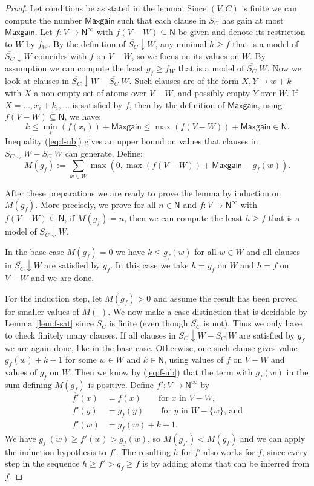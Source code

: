 \documentclass[11pt,a4paper]{article}
\newcommand{\N}{\mathsf{N}}
\newcommand\set[1]{\{#1\}}
\newcommand\Ninf{\N^\infty}
\newcommand\M{\mathsf{Maxgain}}
\newcommand\upS[1]{\overline{S_{#1}}}
\newcommand{\FYI}[1]{{\color{red}#1}}
\begin{document}
\begin{proof}
Let conditions be as stated in the lemma.
\FYI{Since $(V,C)$ is finite we can compute the number
$\M$ such that each clause in $S_C$ has gain at most $\M$.}
Let $f: V\to\Ninf$ with $f(V-W)\subseteq \N$ be given
and denote its restriction to $W$ by $f_W$.
By the definition of $\upS{C}{\downarrow}W$, any minimal $h\geqslant f$
that is a model of $\upS{C}{\downarrow}W$
coincides with $f$ on $V-W$, so we focus on its values on $W$.
By assumption we can compute the least $g_f \geqslant f_W$ that 
is a model of $\upS{C}|W$.
Now we look at clauses in $\upS{C}{\downarrow}W - \upS{C}|W$. 
Such clauses are of the form $X,Y \to w+k$ with $X$ a non-empty
set of atoms over $V-W$, and possibly empty $Y$ over $W$. 
If $X = \ldots,x_i+k_i,\ldots$ is satisfied by $f$, 
then by the definition of $\M$, using $f(V-W)\subseteq \N$,
we have:
\begin{equation}\label{eq:f-ub}
k \leq\min_i(f(x_i)) + \M \leqslant \max(f(V-W)) + \M \in \N.
\end{equation}
\FYI{Inequality (\ref{eq:f-ub}) gives an upper bound on values that clauses 
in $\upS{C}{\downarrow}W - \upS{C}|W$ can generate.} Define:
\[
M(g_f) := \sum_{w \in W}  \max(0, \max(f(V-W)) + \M - g_f(w)).
\] 

\FYI{After these preparations we are ready to prove the lemma
by induction on $M(g_f)$. More precisely, we prove for all $n\in\N$
and $f: V\to\Ninf$ with $f(V-W)\subseteq \N$, if $M(g_f)=n$,
then we can compute
the least $h \geqslant f$ that is a model of $\upS{C}{\downarrow}W$.}

In the base case $M(g_f)=0$ we have $k\leqslant g_f(w)$ for all $w\in W$
and all clauses in $\upS{C}{\downarrow}W$ are satisfied by $g_f$.
In this case we take $h=g_f$ on $W$ and $h=f$ on $V-W$ and we are done.

For the induction step, let $M(g_f)>0$ and assume
the result has been proved for smaller values of $M(\_)$.
We now make a case distinction that is decidable
by Lemma~\ref{lem:f-sat} since
$S_C$ is finite (even though $\upS{C}$ is not).
Thus we only have to check finitely many clauses.
If all clauses in $\upS{C}{\downarrow}W - \upS{C}|W$ are satisfied 
by $g_f$ we are again done, like in the base case.
Otherwise, one such clause gives value $g_f(w)+k+1$ for some $w\in W$ 
and $k\in\N$, using values of $f$ on $V-W$ and values of $g_f$ on $W$. 
Then we know by (\ref{eq:f-ub}) that the term with $g_f(w)$
in the sum defining $M(g_f)$ is positive.
Define $f' : V \to \Ninf$ by 
\begin{align*}
f'(x)&= f(x)   \quad\quad\text{for $x$ in $V-W$,}\\ 
f'(y)&= g_f(y) \quad\quad\text{for $y$ in $W-\set{w}$, and}\\ 
f'(w)&= g_f(w)+k+1. 
\end{align*}
We have $g_{f'}(w) \geqslant f'(w) > g_f(w)$, so $M(g_{f'}) < M(g_f)$
and we can apply the induction hypothesis to $f'$.
The resulting $h$ for $f'$ also works for $f$,
since every step in the sequence 
$h \geqslant f' > g_f \geqslant f$
is by adding atoms that can be inferred from $f$.
\end{proof}
\end{document}
